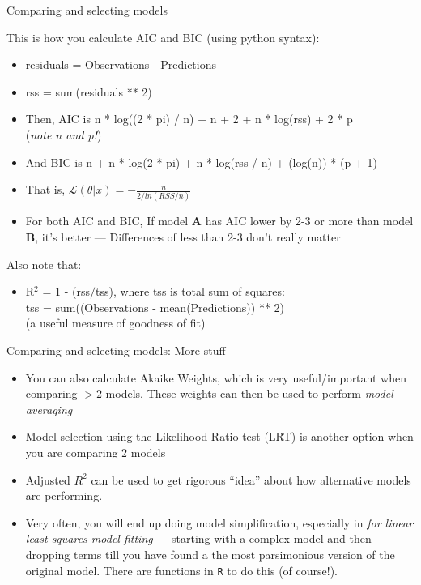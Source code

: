 \documentclass[xcolor=x11names,compress]{beamer}
\renewcommand{\(}{\begin{columns}}
\renewcommand{\)}{\end{columns}}
\newcommand{\<}[1]{\begin{column}{#1}}
\renewcommand{\>}{\end{column}}
\begin{document}
\begin{frame}{Comparing and selecting models}

This is how you calculate AIC and BIC (using python syntax): 

\pause
\begin{itemize}\itemsep10pt
\small
	\item residuals = Observations - Predictions
	\item rss = sum(residuals ** 2) 
	\item Then, AIC is n * log((2 * pi) / n) + n + 2 + n * log(rss) + 2 * p \\
		({\it note n and p!})
	\item And BIC is n + n * log(2 * pi) + n * log(rss / n) + (log(n)) * (p + 1)

	\item That is, 	$ \mathcal{L}(\theta |x) = -\frac{n}{2/ln(RSS/n)}$
	\item For both AIC and BIC, If model {\bf A} has AIC lower by 2-3 or 
	more than model {\bf B}, it's better --- Differences of less than 2-3 
	don't really matter

\end{itemize}

    \pause
Also note that:
\begin{itemize}
\small
	\item R$^{2}$ = 1 - (rss$/$tss), where tss is total sum of squares: \\
tss = sum((Observations - mean(Predictions)) ** 2)\\
(a useful measure of goodness of fit)

\end{itemize}

\end{frame}


\begin{frame}{Comparing and selecting models: More stuff}

\begin{itemize} \itemsep12pt
	\item You can also calculate Akaike Weights, which is very useful/important when comparing $
	> 2$ models. These weights can then be used to perform {\it model averaging}

	\item Model selection using the Likelihood-Ratio test (LRT) is another option when you are comparing 2 models
	
	\item Adjusted $R^2$ can be used to get rigorous ``idea'' about how alternative models are performing. 
	
	\item Very often, you will end up doing  model simplification, especially in {\it for linear least squares model fitting} --- starting with a complex model and then dropping terms till you have found a the most parsimonious version of the original model. There are functions in {\tt R} to do this (of course!). 
\end{itemize}

\end{frame}
\end{document}
